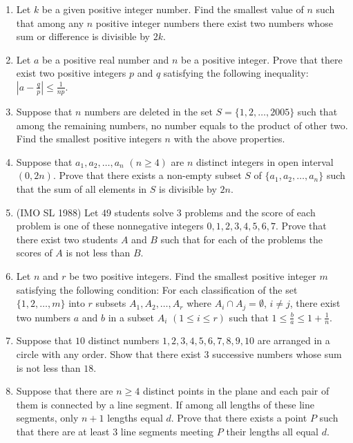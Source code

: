 \documentclass[12pt]{scrartcl}
\begin{document}
\begin{enumerate}
    \item Let $k$ be a given positive integer number. Find the smallest value of $n$ such that among any $n$ positive integer numbers there exist two numbers whose sum or difference is divisible by $2k$.
    
    \item Let $a$ be a positive real number and $n$ be a positive integer. Prove that there exist two positive integers $p$ and $q$ satisfying the following inequality: $\left|a-\frac{q}{p}\right| \le \frac{1}{np}$.
    
    \item Suppose that $n$ numbers are deleted in the set $S = \{1 ,2, \dots , 2005 \}$ such that among the remaining numbers, no number equals to the product of other two. Find the smallest positive integers $n$ with the above properties.
    
    \item Suppose that $a_1, a_2, \dots, a_n$ $(n \ge 4)$ are $n$ distinct integers in open interval $(0, 2n)$. Prove that there exists a non-empty subset $S$ of $\{a_1, a_2, \dots, a_n\}$ such that the sum of all elements in $S$ is divisible by $2n$.
    
    \item (IMO SL 1988) Let $49$ students solve $3$ problems and the score of each problem is one of these nonnegative integers $0, 1, 2, 3, 4, 5, 6, 7$. Prove that there exist two students $A$ and $B$ such that for each of the problems the scores of $A$ is not less than $B$.
    
    \item Let $n$ and $r$ be two positive integers. Find the smallest positive integer $m$ satisfying the following condition: For each classification of the set $\{1, 2, \dots, m \}$ into $r$ subsets $A_1, A_2, \dots, A_r$ where $A_i \cap A_j = \emptyset$, $i \neq j$, there exist two numbers $a$ and $b$ in a subset $A_i$ $(1 \le i \le r)$ such that $1 \le \frac{b}{a} \le 1 + \frac{1}{n}$.

    \item Suppose that $10$ distinct numbers $1, 2, 3, 4, 5, 6, 7,8, 9, 10$ are arranged in a circle with any order. Show that there exist $3$ successive numbers whose sum is not less than $18$.
    
    \item Suppose that there are $n \ge 4$ distinct points in the plane and each pair of them is connected by a line segment. If among all lengths of these line segments, only $n + 1$ lengths equal $d$. Prove that there exists a point $P$ such that there are at least $3$ line segments meeting $P$ their lengths all equal $d$.


\end{enumerate}
\end{document}
